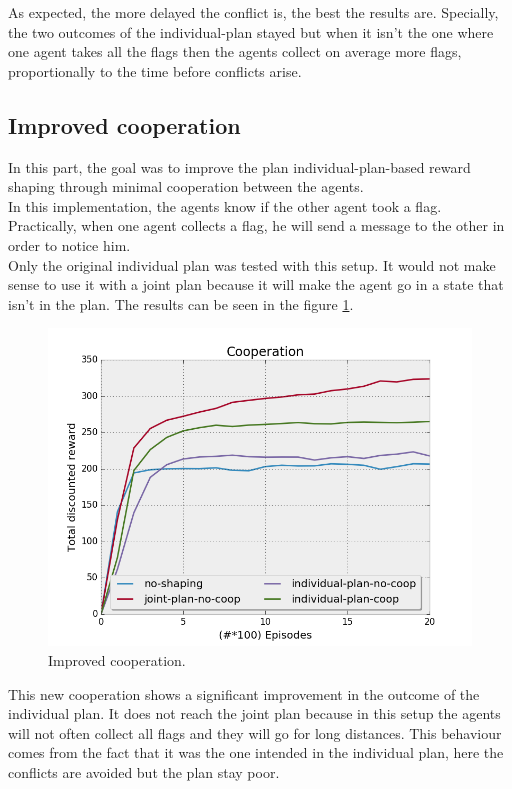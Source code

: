 \documentclass[letterpaper]{article}
\begin{document}
As expected, the more delayed the conflict is, the best the results are. Specially, the two outcomes of the individual-plan stayed but when it isn't the one where one agent takes all the flags then the agents collect on average more flags, proportionally to the time before conflicts arise.

\subsection{Improved cooperation}

In this part, the goal was to improve the plan individual-plan-based reward shaping through minimal cooperation between the agents.\\
In this implementation, the agents know if the other agent took a flag. Practically, when one agent collects a flag, he will send a message to the other in order to notice him.\\
Only the original individual plan was tested with this setup. It would not make sense to use it with a joint plan because it will make the agent go in a state that isn't in the plan. The results can be seen in the figure \ref{fig:results3}.

\begin{figure}[h!]
  \includegraphics[width=\linewidth]{img/coop.png}
  \caption{Improved cooperation.}
  \label{fig:results3}
\end{figure}

This new cooperation shows a significant improvement in the outcome of the individual plan. It does not reach the joint plan because in this setup the agents will not often collect all flags and they will go for long distances. This behaviour comes from the fact that it was the one intended in the individual plan, here the conflicts are avoided but the plan stay poor.
\end{document}
